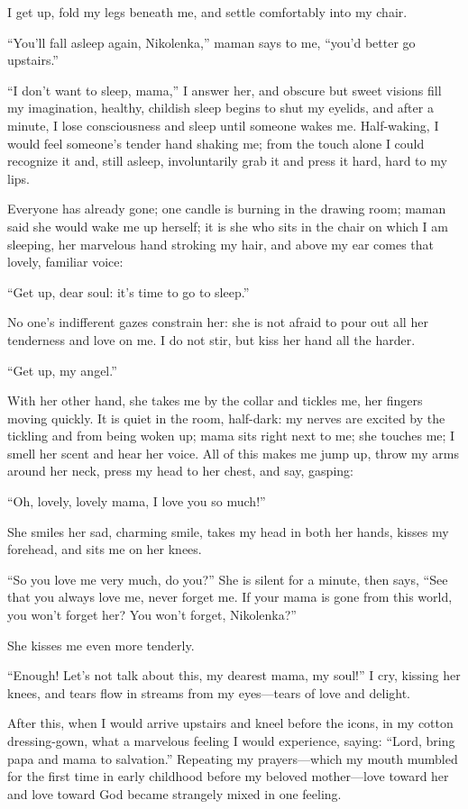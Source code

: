 I get up, fold my legs beneath me, and settle comfortably into my chair.

``You'll fall asleep again, Nikolenka,'' maman says to me, ``you'd better go upstairs.'' %

``I don't want to sleep, mama,'' I answer her, and obscure but sweet visions fill my imagination, healthy, childish sleep begins to shut my eyelids, and after a minute, I lose consciousness and sleep until someone wakes me. Half-waking, I would feel someone's tender hand shaking me; from the touch alone I could recognize it and, still asleep, involuntarily grab it and press it hard, hard to my lips. %

Everyone has already gone; one candle is burning in the drawing room; maman said she would wake me up herself; it is she who sits in the chair on which I am sleeping, her marvelous hand stroking my hair, and above my ear comes that lovely, familiar voice:

``Get up, dear soul: it's time to go to sleep.'' %

No one's indifferent gazes constrain her: she is not afraid to pour out all her tenderness and love on me. I do not stir, but kiss her hand all the harder.

``Get up, my angel.'' %

With her other hand, she takes me by the collar and tickles me, her fingers moving quickly. It is quiet in the room, half-dark: my nerves are excited by the tickling and from being woken up; mama sits right next to me; she touches me; I smell her scent and hear her voice. All of this makes me jump up, throw my arms around her neck, press my head to her chest, and say, gasping:

``Oh, lovely, lovely mama, I love you so much!'' %

She smiles her sad, charming smile, takes my head in both her hands, kisses my forehead, and sits me on her knees.

``So you love me very much, do you?'' She is silent for a minute, then says, ``See that you always love me, never forget me. If your mama is gone from this world, you won't forget her? You won't forget, Nikolenka?'' %

She kisses me even more tenderly.

``Enough! Let's not talk about this, my dearest mama, my soul!'' I cry, kissing her knees, and tears flow in streams from my eyes---tears of love and delight. %

After this, when I would arrive upstairs and kneel before the icons, in my cotton dressing-gown, what a marvelous feeling I would experience, saying: ``Lord, bring papa and mama to salvation.'' Repeating my prayers---which my mouth mumbled for the first time in early childhood before my beloved mother---love toward her and love toward God became strangely mixed in one feeling.

